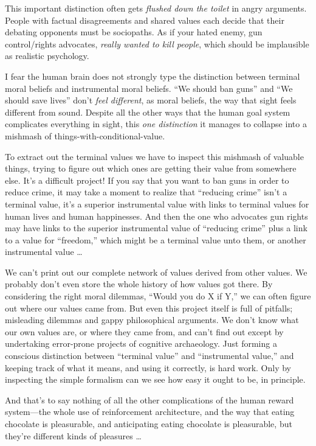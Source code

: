 {
 This important distinction often gets \textit{flushed down the
toilet} in angry arguments. People with factual disagreements and
shared values each decide that their debating opponents must be
sociopaths. As if your hated enemy, gun control/rights advocates,
\textit{really wanted to kill people}, which should be implausible as
realistic psychology.}

{
 I fear the human brain does not strongly type the distinction
between terminal moral beliefs and instrumental moral beliefs.
``We should ban guns'' and
``We should save lives''
don't \textit{feel different}, as moral beliefs, the
way that sight feels different from sound. Despite all the other ways
that the human goal system complicates everything in sight, this
\textit{one distinction} it manages to collapse into a mishmash of
things-with-conditional-value.}

{
 To extract out the terminal values we have to inspect this
mishmash of valuable things, trying to figure out which ones are
getting their value from somewhere else. It's a
difficult project! If you say that you want to ban guns in order to
reduce crime, it may take a moment to realize that
``reducing crime''
isn't a terminal value, it's a superior
instrumental value with links to terminal values for human lives and
human happinesses. And then the one who advocates gun rights may have
links to the superior instrumental value of ``reducing
crime'' plus a link to a value for
``freedom,'' which might be a
terminal value unto them, or another instrumental value \ldots}

{
 We can't print out our complete network of values
derived from other values. We probably don't even store
the whole history of how values got there. By considering the right
moral dilemmas, ``Would you do X if
Y,'' we can often figure out where our values came
from. But even this project itself is full of pitfalls; misleading
dilemmas and gappy philosophical arguments. We don't
know what our own values are, or where they came from, and
can't find out except by undertaking error-prone
projects of cognitive archaeology. Just forming a conscious distinction
between ``terminal value'' and
``instrumental value,'' and keeping
track of what it means, and using it correctly, is hard work. Only by
inspecting the simple formalism can we see how easy it ought to be, in
principle.}

{
 And that's to say nothing of all the other
complications of the human reward system---the whole use of
reinforcement architecture, and the way that eating chocolate is
pleasurable, and anticipating eating chocolate is pleasurable, but
they're different kinds of pleasures \ldots}

